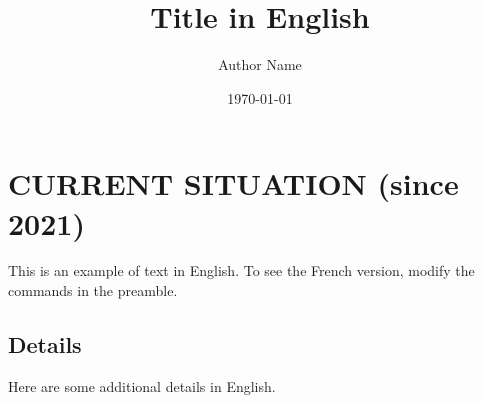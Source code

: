\documentclass{article}
\newcommand{\fr}[1]{} %
\newcommand{\en}[1]{#1}   %
\begin{document}
\title{\fr{Titre en Français}\en{Title in English}}
\author{\fr{Nom de l'Auteur}\en{Author Name}}
\date{\today}

\maketitle

\section{\fr{SITUATION ACTUELLE (depuis 2021)}\en{CURRENT SITUATION (since 2021)}}

\fr{Ceci est un exemple de texte en français. Pour voir la version anglaise, modifiez les commandes dans le préambule.}
\en{This is an example of text in English. To see the French version, modify the commands in the preamble.}

\subsection{\fr{Détails}\en{Details}}
\fr{Voici quelques détails supplémentaires en français.}
\en{Here are some additional details in English.}

\end{document}
